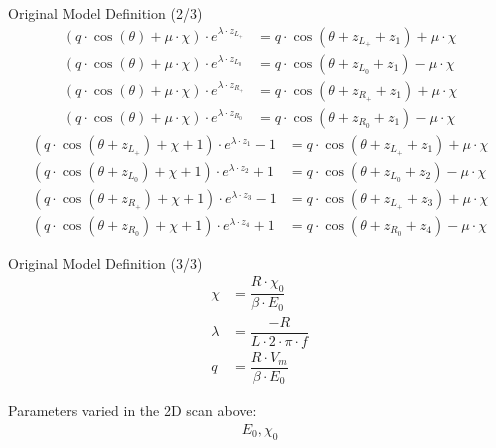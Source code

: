 \begin{frame}{Original Model Definition (2/3)}
	\begin{subequations}
		\begin{align}
			(q \cdot \cos(\theta) + \mu \cdot \chi) \cdot e^{\lambda \cdot z_{L_+}}
			 & = q \cdot \cos(\theta + z_{L_+} + z_1) + \mu \cdot \chi \\
			(q \cdot \cos(\theta) + \mu \cdot \chi) \cdot e^{\lambda \cdot z_{L_0}}
			 & = q \cdot \cos(\theta + z_{L_0} + z_1) - \mu \cdot \chi \\
			(q \cdot \cos(\theta) + \mu \cdot \chi) \cdot e^{\lambda \cdot z_{R_+}}
			 & = q \cdot \cos(\theta + z_{R_+} + z_1) + \mu \cdot \chi \\
			(q \cdot \cos(\theta) + \mu \cdot \chi) \cdot e^{\lambda \cdot z_{R_0}}
			 & = q \cdot \cos(\theta + z_{R_0} + z_1) - \mu \cdot \chi
		\end{align}
	\end{subequations}
	\begin{subequations}
		\begin{align}
			(q \cdot \cos(\theta + z_{L_+}) + \chi + 1) \cdot e^{\lambda \cdot z_1} - 1
			 & = q \cdot  \cos(\theta + z_{L_+} + z_1) + \mu \cdot \chi \\
			(q \cdot \cos(\theta + z_{L_0}) + \chi + 1) \cdot e^{\lambda \cdot z_2} + 1
			 & = q \cdot  \cos(\theta + z_{L_0} + z_2) - \mu \cdot \chi \\
			(q \cdot \cos(\theta + z_{R_+}) + \chi + 1) \cdot e^{\lambda \cdot z_3} - 1
			 & = q \cdot  \cos(\theta + z_{L_+} + z_3) + \mu \cdot \chi \\
			(q \cdot \cos(\theta + z_{R_0}) + \chi + 1) \cdot e^{\lambda \cdot z_4} + 1
			 & = q \cdot  \cos(\theta + z_{R_0} + z_4) - \mu \cdot \chi
		\end{align}
	\end{subequations}
\end{frame}

\begin{frame}{Original Model Definition (3/3)}
	\begin{align}
		\chi    & = \dfrac{R \cdot \chi_0}{\beta \cdot E_0} \\
		\lambda & = \dfrac{-R}{L \cdot 2 \cdot \pi \cdot f} \\
		q       & = \dfrac{R \cdot V_m}{\beta \cdot E_0}
	\end{align}

	Parameters varied in the 2D scan above:
	\begin{align*}
		E_0, \chi_0
	\end{align*}
\end{frame}
